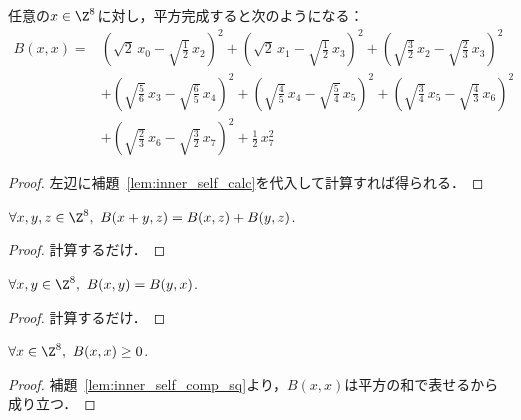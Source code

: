 \begin{lemma}
  \label{lem:inner_self_comp_sq}
  \leanok
  任意の$x \in \Z^8$に対し，平方完成すると次のようになる：
  \begin{equation}
    \begin{split}
      B(x, x) ={}& \left( \sqrt{2} \, x_0 - \sqrt{\frac{1}{2}} \, x_2 \right)^2 + \left( \sqrt{2} \, x_1 - \sqrt{\frac{1}{2}} \, x_3 \right)^2 + \left( \sqrt{\frac{3}{2}} \, x_2 - \sqrt{\frac{2}{3}} \, x_3 \right)^2 \\
      & + \left( \sqrt{\frac{5}{6}} \, x_3 - \sqrt{\frac{6}{5}} \, x_4 \right)^2 + \left( \sqrt{\frac{4}{5}} \, x_4 - \sqrt{\frac{5}{4}} \, x_5 \right)^2 + \left( \sqrt{\frac{3}{4}} \, x_5 - \sqrt{\frac{4}{3}} \, x_6 \right)^2 \\
      & + \left( \sqrt{\frac{2}{3}} \, x_6 - \sqrt{\frac{3}{2}} \, x_7 \right)^2 + \frac{1}{2} \, x_7^2
    \end{split}
  \end{equation}
\end{lemma}

\begin{proof}
  \leanok
  左辺に補題~\ref{lem:inner_self_calc}を代入して計算すれば得られる．
\end{proof}

\begin{theorem}
  \label{thm:add_inner}
  \leanok
  $\forall x, y, z \in \Z^8,\ B(x+y, z) = B(x, z) + B(y, z)$.
\end{theorem}

\begin{proof}
  \leanok
  計算するだけ．
\end{proof}

\begin{theorem}
  \label{thm:inner_sym}
  \leanok
  $\forall x, y \in \Z^8,\ B(x, y) = B(y, x)$.
\end{theorem}

\begin{proof}
  \leanok
  計算するだけ．
\end{proof}

\begin{theorem}
  \label{thm:inner_self}
  \leanok
  $\forall x \in \Z^8,\ B(x, x) \ge 0$.
\end{theorem}

\begin{proof}
  \leanok
  補題~\ref{lem:inner_self_comp_sq}より，$B(x, x)$は平方の和で表せるから成り立つ．
\end{proof}

